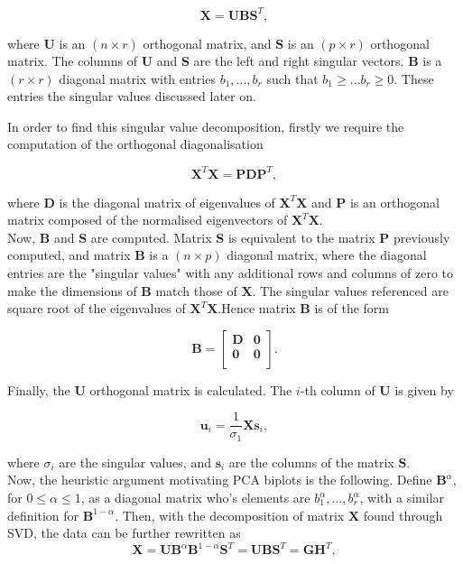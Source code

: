 \documentclass{article}\usepackage[]{graphicx}\usepackage[]{xcolor}
\numberwithin{equation}{section}
\begin{document}
{\[\mathbf{X} = \mathbf{U}\mathbf{B}\mathbf{S}^{T}, \]

\noindent where $\mathbf{U}$ is an $(n \times r)$ orthogonal matrix, and $\mathbf{S}$ is an $(p \times r)$ orthogonal matrix. The columns of $\mathbf{U}$ and $\mathbf{S}$ are the left and right singular vectors. $\mathbf{B}$ is a $(r \times r)$ diagonal matrix with entries $b_1, \ldots, b_r$ such that $b_1 \geq \dots b_r \geq 0$. These entries the singular values discussed later on. %

\noindent In order to find this singular value decomposition, firstly we require the computation of the orthogonal diagonalisation  

\[
\mathbf{X}^T\mathbf{X}=\mathbf{PDP}^T,
\] 

\noindent where $\mathbf{D}$ is the diagonal matrix of eigenvalues of $\mathbf{X}^T\mathbf{X}$ and $\mathbf{P}$ is an orthogonal matrix composed of the normalised eigenvectors of $\mathbf{X}^T\mathbf{X}$.\\

\noindent Now, $\mathbf{B}$ and $\mathbf{S}$ are computed. Matrix $\mathbf{S}$ is equivalent to the matrix $\mathbf{P}$ previously computed, and matrix $\mathbf{B}$ is a $(n \times p)$ diagonal matrix, where the diagonal entries are the "singular values" with any additional rows and columns of zero to make the dimensions of $\mathbf{B}$ match those of $\mathbf{X}$. The singular values referenced are square root of the eigenvalues of $\mathbf{X}^T\mathbf{X}$.Hence matrix $\mathbf{B}$ is of the form

\[
\mathbf{B} = 
\begin{bmatrix}
    \mathbf{D} & \mathbf{0} \\
    \mathbf{0} & \mathbf{0} \\
\end{bmatrix}.
\]

\noindent Finally, the $\mathbf{U}$ orthogonal matrix is calculated. The $i$-th column of $\mathbf{U}$ is given by

\[
\mathbf{u}_i = \frac{1}{\sigma_1}\mathbf{X}\mathbf{s}_i,
\]

\noindent where $\sigma_i$ are the singular values, and $\mathbf{s}_i$ are the columns of the matrix $\mathbf{S}$.\\



\noindent Now, the heuristic argument motivating PCA biplots is the following. Define $\mathbf{B}^{\alpha}$, for $0 \leq \alpha \leq 1$, as a diagonal matrix who's elements are $b_1^{\alpha}, \ldots, b_r^{\alpha}$, with a similar definition for $\mathbf{B}^{1-\alpha}.$ Then, with the decomposition of matrix $\mathbf{X}$ found through SVD, the data can be further rewritten as
\[\mathbf{X} = \mathbf{U}\mathbf{B}^{\alpha}\mathbf{B}^{1-\alpha}\mathbf{S}^{T} = \mathbf{U}\mathbf{B}\mathbf{S}^{T} = \mathbf{G}\mathbf{H}^{T},\]

}
\end{document}
